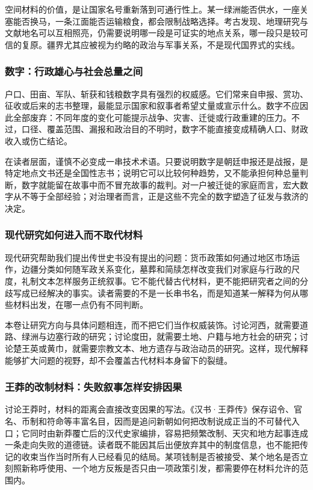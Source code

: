 空间材料的价值，是让国家名号重新落到可通行性上。某一绿洲能否供水，一座关塞能否换马，一条江面能否运输粮食，都会限制战略选择。考古发现、地理研究与文献地名可以互相照亮，仍需要说明哪一段是可证实的地点关系，哪一段只是较可信的复原。疆界尤其应被视为约略的政治与军事关系，不是现代国界式的实线。

\subsubsection{数字：行政雄心与社会总量之间}

户口、田亩、军队、斩获和钱粮数字具有强烈的权威感。它们常来自申报、赏功、征收或后来的志书整理，最能显示国家和叙事者希望丈量或宣示什么。数字不应因此全部废弃：不同年度的变化可能提示战争、灾害、迁徙或行政重建的压力。不过，口径、覆盖范围、漏报和政治目的不明时，数字不能直接变成精确人口、财政收入或伤亡结论。

在读者层面，谨慎不必变成一串技术术语。只要说明数字是朝廷申报还是战报，是特定地点文书还是全国性志书；说明它可以比较何种趋势，又不能承担何种总量判断，数字就能留在故事中而不冒充故事的裁判。对一户被迁徙的家庭而言，宏大数字从不等于全部经验；对治理者而言，正是这些不完全的数字塑造了征发与救济的决定。

\subsubsection{现代研究如何进入而不取代材料}

现代研究帮助我们提出传世史书没有提出的问题：货币政策如何通过地区市场运作，边疆分类如何随军政关系变化，墓葬和简牍怎样改变我们对家庭与行政的尺度，礼制文本怎样服务正统叙事。它不能代替古代材料，更不能把研究者之间的分歧写成已经解决的事实。读者需要的不是一长串书名，而是知道某一解释为何从哪些材料出发，在哪一点仍有不同判断。

本卷让研究方向与具体问题相连，而不把它们当作权威装饰。讨论河西，就需要道路、绿洲与边塞行政的研究；讨论度田，就需要土地、户籍与地方社会的研究；讨论楚王英或黄巾，就需要宗教文本、地方遗存与政治动员的研究。这样，现代解释能够扩大问题的视野，却不会覆盖古代材料本身留下的裂缝。

\subsubsection{王莽的改制材料：失败叙事怎样安排因果}

讨论王莽时，材料的距离会直接改变因果的写法。《汉书·王莽传》保存诏令、官名、币制和符命等丰富名目，因而是追问新朝如何把改制说成正当的不可替代入口；它同时由新莽覆亡后的汉代史家编排，容易把频繁改制、天灾和地方起事连成一条走向失败的道德链。读者既不能因其后出便放弃其中的制度信息，也不能把传记的收束当作当时所有人已经看见的结局。某项钱制是否被接受、某个地名是否立刻照新称呼使用、一个地方反叛是否只由一项政策引发，都需要停在材料允许的范围内。

